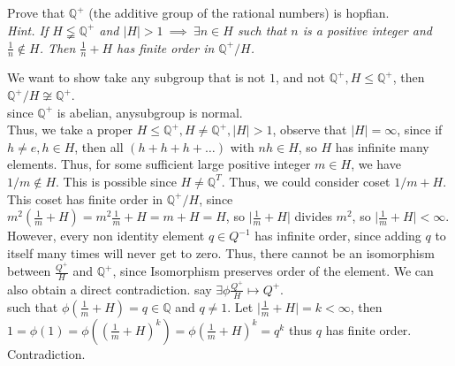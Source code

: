 \documentclass{article}
\begin{document}
\begin{homeworkProblem}
    
\end{homeworkProblem}

\pagebreak

\begin{homeworkProblem}
    Prove that $\mathbb{Q}^{+}$ (the additive group of the rational numbers) is hopfian.\\
    \textit{Hint. If $H \lneqq \mathbb{Q}^{+}$ and 
        $\lvert H \rvert > 1 \ \implies \ \exists n \in H$ 
        such that $n$ is a positive integer and $\frac{ 1 }{ n } \not\in H$.
    Then $\frac{ 1 }{ n } + H$ has finite order in $\mathbb{Q}^{+} / H$.}\\
    \solution

    We want to show take any subgroup that is not $1$, and not $\mathbb{Q}^{+}, H \leq \mathbb{Q}^+$,
    then $\mathbb{Q}^{+} / H \not\cong \mathbb{Q}^+$.\\
    since $\mathbb{Q}^{+}$ is abelian, anysubgroup is normal.\\
    Thus, we take a proper $H \leq \mathbb{Q}^+, H \neq \mathbb{Q}^+, \lvert H \rvert > 1$,
    observe that $\lvert H \rvert = \infty$, since if $h \neq e, h \in H$, 
    then all $(h+h+h+ \ldots)$ with $nh \in H$, so $H$ has 
    infinite many elements. Thus, for some sufficient large positive integer $m \in H$,
    we have $1/m \not\in H$. 
    This is possible since $H \neq \mathbb{Q}^T$. Thus, we could consider coset $1/m + H$.
    This coset has finite order in $\mathbb{Q}^+/H$, 
    since $m^2 (\frac{ 1 }{ m } + H) = m^2 \frac{ 1 }{ m } + H = m + H = H$,
    so $\lvert \frac{ 1 }{ m } + H \rvert$ divides $m^2$, so $\lvert \frac{ 1 }{ m } + H \rvert < \infty$.
    However, every non identity element $q \in Q^{-1}$ has infinite order, since 
    adding $q$ to itself many times will never get to zero. Thus, there cannot be 
    an isomorphism between $\frac{ Q^+ }{ H }$ and $\mathbb{Q}^+$, 
    since Isomorphism preserves order of the element. 
    We can also obtain a direct contradiction. say $\exists \phi \frac{ Q^+ }{ H } \mapsto Q^+$.\\
    such that $\phi(\frac{ 1 }{ m } + H) = q \in \mathbb{Q}$ and $q \neq 1$.
    Let $\lvert \frac{ 1 }{ m } + H \rvert = k < \infty$,
    then $1=\phi(1)=\phi \left( (\frac{ 1 }{ m } + H )^k \right) = \phi (\frac{ 1 }{ m }+H)^k = q^k$
    thus $q$ has finite order. Contradiction.


    
\end{homeworkProblem}

\pagebreak
\end{document}
